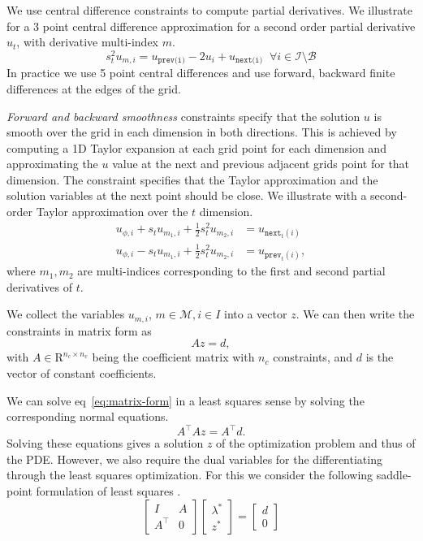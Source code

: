 We use central difference constraints to compute partial derivatives. 
We illustrate for a 3 point central difference approximation for a second order partial derivative $u_t$, with derivative multi-index $m$. 
\begin{equation}
s_{t}^2u_{m,i} =u_{\texttt{prev(i)}} -2u_i + u_{\texttt{next(i)}}  \;\; \forall i \in \mathcal{I\setminus\mathcal{B}}
\end{equation}
In practice we use 5 point central differences and use forward, backward finite differences at the edges of the grid.

\emph{Forward and backward smoothness} constraints specify that the solution $u$ is smooth over the grid in each dimension in both directions.
This is achieved by computing a 1D Taylor expansion at each grid point for each dimension and approximating the $u$ value at the next and previous adjacent grids point for that dimension.
The constraint specifies that the Taylor approximation and the solution variables at the next point should be close.
We illustrate with a second-order Taylor approximation over the $t$ dimension.
\begin{align}
u_{\phi,i} + s_t u_{m_1,i} + \frac{1}{2}s_t^2 u_{m_2,i} &= u_{\texttt{next}_{t}(i)}\\
u_{\phi,i} - s_t u_{m_1,i} + \frac{1}{2}s_t^2 u_{m_2,i} &= u_{\texttt{prev}_{t}(i)},
\end{align}
where $m_1,m_2$ are multi-indices corresponding to the first and second partial derivatives of $t$.

We collect the variables $u_{m,i}$, $m\in\mathcal{M}, i\in I$ into a vector $z$. 
We can then write the constraints in matrix form as 
\begin{equation}
Az=d,\label{eq:matrix-form}
\end{equation}
with $A\in\mathrm{R}^{n_c\times n_v}$ being the coefficient matrix with $n_c$ constraints, and $d$ is the vector of constant coefficients.

We can solve eq~\eqref{eq:matrix-form} in a least squares sense by solving the corresponding normal equations.
\begin{equation}
A^\intercal Az= A^\intercal d.\label{eq:normal-eq-form}
\end{equation}
Solving these equations gives a solution $z$ of the optimization problem and thus of the PDE. 
However, we also require the dual variables for the differentiating through the least squares optimization.
For this we consider the following saddle-point formulation of least squares \cite{saad2003iterative}.
\begin{equation}
\begin{bmatrix}
I & A\\
A^\intercal& 0
\end{bmatrix}
\begin{bmatrix}
\lambda^*\\
z^*
\end{bmatrix}
= 
\begin{bmatrix}
d\\
0
\end{bmatrix}\label{eq:kkt-forward}
\end{equation}

